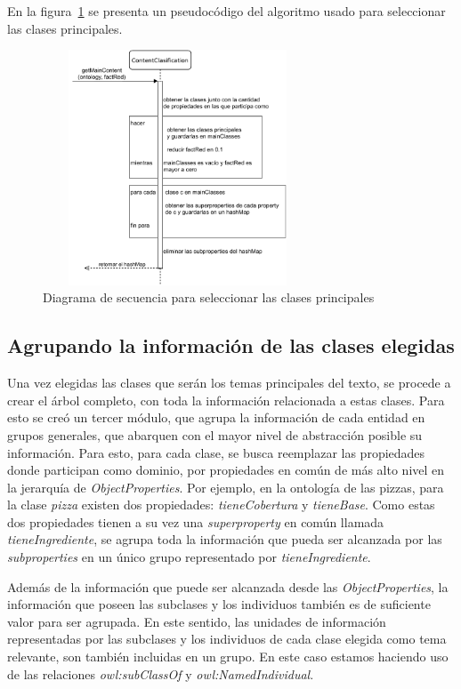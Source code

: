 En la figura~\ref{fig:diagrama_secuencia_getMainContent} se presenta un pseudocódigo del algoritmo usado para seleccionar las clases principales.

\begin{figure}[H]
    \centering
    \includegraphics[width=8cm, height=7cm]{img/organizacion_informacion/secuencia_getMainContent.pdf}
    \caption{Diagrama de secuencia para seleccionar las clases principales}
    \label{fig:diagrama_secuencia_getMainContent}
\end{figure}


\subsection{Agrupando la información de las clases elegidas}
\label{sec:agrupando_info}
Una vez elegidas las clases que serán los temas principales del texto, se procede a crear el árbol completo, con toda la información relacionada a estas clases. Para esto se creó un tercer módulo, que agrupa la información de cada entidad en grupos generales, que abarquen con el mayor nivel de abstracción  posible su información. Para esto, para cada clase, se busca reemplazar las propiedades donde participan como dominio, por propiedades en común de más alto nivel en la jerarquía de \emph{ObjectProperties}. Por ejemplo, en la ontología de las pizzas, para la clase \emph{pizza} existen dos propiedades: \emph{tieneCobertura} y \emph{tieneBase}. Como estas dos propiedades tienen a su vez una \emph{superproperty} en común llamada \emph{tieneIngrediente}, se agrupa toda la información que pueda ser alcanzada por las \emph{subproperties} en un único grupo representado por \emph{tieneIngrediente}. 

Además de la información que puede ser alcanzada desde las \emph{ObjectProperties}, la información que poseen las subclases y los individuos también es de suficiente valor para ser agrupada. En este sentido, las unidades de información representadas por las subclases y los individuos de cada clase elegida como tema relevante, son también incluidas en un grupo. En este caso estamos haciendo uso de las relaciones \emph{owl:subClassOf} y \emph{owl:NamedIndividual}.

